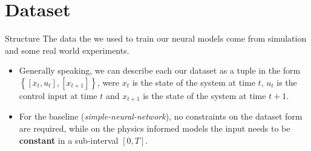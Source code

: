 \documentclass{beamer}
\begin{document}
\section{Dataset}
\begin{frame}{Structure}
    The data the we used to train our neural models come from simulation and
    some real world experiments. 
    \vspace{1em}
    \begin{itemize}
        \item Generally speaking, we can describe each our dataset as a tuple in the form $\left\{[x_{t}, u_{t}], [x_{t+1}]\right\}$, were $x_{t}$ is the state of the system at time $t$, $u_{t}$ is the control input at time $t$ and $x_{t+1}$ is the state of the system at time $t+1$.
        \item For the baseline (\textit{simple-neural-network}), no constraints on the dataset form are required, while on the physics informed models the input needs to be \textbf{constant} in a sub-interval $[0, T]$.
    \end{itemize}
\end{frame}
\end{document}
